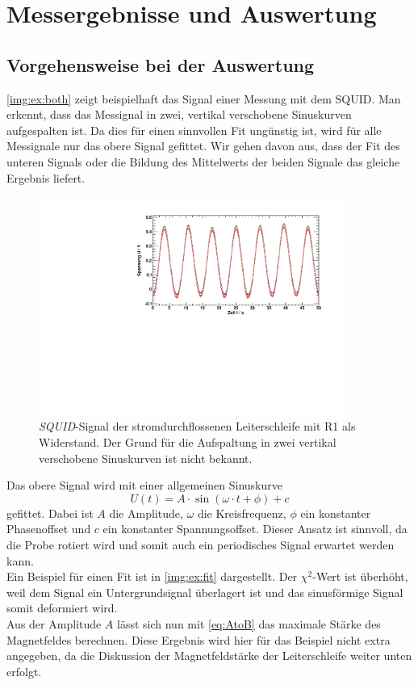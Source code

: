 \section{Messergebnisse und Auswertung}

\subsection{Vorgehensweise bei der Auswertung}
\autoref{img:ex:both} zeigt beispielhaft das Signal einer Messung mit dem SQUID. Man erkennt, dass das Messignal in zwei, vertikal verschobene 
Sinuskurven aufgespalten ist. Da dies für einen sinnvollen Fit ungünstig ist, wird für alle Messignale nur das obere Signal gefittet. 
Wir gehen davon aus, dass der Fit des unteren Signals oder die Bildung des Mittelwerts der beiden Signale das gleiche Ergebnis liefert.
\begin{figure}[H]
\begin{center}
  \includegraphics[width=0.9\textwidth]{../img/both_Spule_R1.pdf}
  \caption{\emph{SQUID}-Signal der stromdurchflossenen Leiterschleife mit R1 als Widerstand.
  Der Grund für die Aufspaltung in zwei vertikal verschobene Sinuskurven ist nicht bekannt.}
  \label{img:ex:both}
\end{center}
\end{figure}

Das obere Signal wird mit einer allgemeinen Sinuskurve
\begin{equation}
  \label{eq:fit}
  U(t) = A \cdot \sin(\omega \cdot t + \phi) + c
\end{equation}
gefittet. Dabei ist $A$ die Amplitude, $\omega$ die Kreisfrequenz, $\phi$ ein konstanter Phasenoffset und $c$ ein konstanter Spannungsoffset.
Dieser Ansatz ist sinnvoll, da die Probe rotiert wird und somit auch ein periodisches Signal erwartet werden kann. \\
Ein Beispiel für einen Fit ist in \autoref{img:ex:fit} dargestellt. Der $\chi^2$-Wert ist überhöht, weil dem Signal ein Untergrundsignal überlagert 
ist und das sinusförmige Signal somit deformiert wird. \\
Aus der Amplitude $A$ lässt sich nun mit \autoref{eq:AtoB} das maximale Stärke des Magnetfeldes berechnen. Diese Ergebnis wird hier für das 
Beispiel nicht extra angegeben, da die Diskussion der Magnetfeldstärke der Leiterschleife weiter unten erfolgt.

